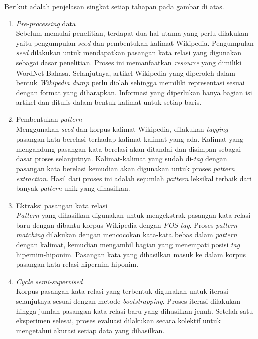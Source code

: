 \noindent Berikut adalah penjelasan singkat setiap tahapan pada gambar di atas.
\begin{enumerate}
  \item \textit{Pre-processing} data \\
  Sebelum memulai penelitian, terdapat dua hal utama yang perlu dilakukan yaitu pengumpulan \textit{seed} dan pembentukan kalimat Wikipedia. Pengumpulan \textit{seed} dilakukan untuk mendapatkan pasangan kata relasi yang digunakan sebagai dasar penelitian. Proses ini memanfaatkan \textit{resource} yang dimiliki WordNet Bahasa. Selanjutnya, artikel Wikipedia yang diperoleh dalam bentuk \textit{Wikipedia dump} perlu diolah sehingga memiliki representasi sesuai dengan format yang diharapkan. Informasi yang diperlukan hanya bagian isi artikel dan ditulis dalam bentuk kalimat untuk setiap baris.
  \item Pembentukan \textit{pattern} \\
  Menggunakan \textit{seed} dan korpus kalimat Wikipedia, dilakukan \textit{tagging} pasangan kata berelasi terhadap kalimat-kalimat yang ada. Kalimat yang mengandung pasangan kata berelasi akan ditandai dan disimpan sebagai dasar proses selanjutnya. Kalimat-kalimat yang sudah di-\textit{tag} dengan pasangan kata berelasi kemudian akan digunakan untuk proses \textit{pattern extraction}. Hasil dari proses ini adalah sejumlah \textit{pattern} leksikal terbaik dari banyak \textit{pattern} unik yang dihasilkan.
  \item Ektraksi pasangan kata relasi \\
  \textit{Pattern} yang dihasilkan digunakan untuk mengekstrak pasangan kata relasi baru dengan dibantu korpus Wikipedia dengan \textit{POS tag}. Proses \textit{pattern matching} dilakukan dengan mencocokan kata-kata bebas dalam \textit{pattern} dengan kalimat, kemudian mengambil bagian yang menempati posisi \textit{tag} hipernim-hiponim. Pasangan kata yang dihasilkan masuk ke dalam korpus pasangan kata relasi hipernim-hiponim.
  \item \textit{Cycle semi-supervised} \\ 
  Korpus pasangan kata relasi yang terbentuk digunakan untuk iterasi selanjutnya sesuai dengan metode \textit{bootstrapping}. Proses iterasi dilakukan hingga jumlah pasangan kata relasi baru yang dihasilkan jenuh. Setelah satu eksperimen selesai, proses evaluasi dilakukan secara kolektif untuk mengetahui akurasi setiap data yang dihasilkan.
\end{enumerate}

